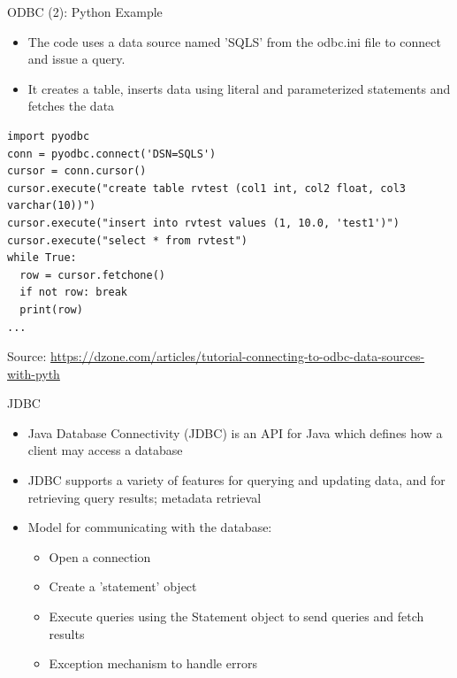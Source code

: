 \documentclass[aspectratio=169, xcolor=dvipsnames]{beamer}
\begin{document}
\begin{frame}[fragile]{ODBC (2): Python Example}
    \begin{itemize}
        \item The code uses a data source named 'SQLS' from the odbc.ini file to connect and issue a query.
        \item It creates a table, inserts data using literal and parameterized statements and fetches the data
    \end{itemize}
    \begin{verbatim}
import pyodbc 
conn = pyodbc.connect('DSN=SQLS')
cursor = conn.cursor()
cursor.execute("create table rvtest (col1 int, col2 float, col3 varchar(10))")
cursor.execute("insert into rvtest values (1, 10.0, 'test1')")
cursor.execute("select * from rvtest")
while True:
  row = cursor.fetchone()
  if not row: break
  print(row)
...
    \end{verbatim}
    \small Source: \url{https://dzone.com/articles/tutorial-connecting-to-odbc-data-sources-with-pyth}
\end{frame}

\begin{frame}{JDBC}
    \begin{itemize}[<+->]
        \item Java Database Connectivity (JDBC) is an API for Java which defines how a client may access a database
        \item JDBC supports a variety of features for querying and updating data, and for retrieving query results; metadata retrieval
        \item Model for communicating with the database:
        \begin{itemize}
            \item[$\triangleright$] Open a connection
            \item[$\triangleright$] Create a 'statement' object
            \item[$\triangleright$] Execute queries using the Statement object to send queries and fetch results
            \item[$\triangleright$] Exception mechanism to handle errors
        \end{itemize}
    \end{itemize}
\end{frame}
\end{document}
